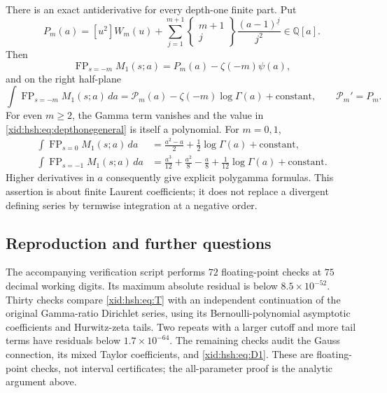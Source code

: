 There is an exact antiderivative for every depth-one finite part. Put
\[
 P_m(a)=[u^2]W_m(u)+
       \sum_{j=1}^{m+1}{\left\{\begin{matrix}m+1\\j\end{matrix}\right\}}
                 \frac{(a-1)^{\underline j}}{j^2}\in\mathbb Q[a].
\]
Then
\begin{equation}\label{xid:hsh:eq:depthonegeneral}
 \operatorname{FP}_{s=-m}M_1(s;a)
       =P_m(a)-\zeta(-m)\psi(a),
\end{equation}
and on the right half-plane
\begin{equation}\label{xid:hsh:eq:primitive}
 \int\operatorname{FP}_{s=-m}M_1(s;a)\,da
       =\mathcal P_m(a)-\zeta(-m)\log\Gamma(a)+\text{constant},
 \qquad \mathcal P_m'=P_m.
\end{equation}
For even $m\ge2$, the Gamma term vanishes and the value in
\eqref{xid:hsh:eq:depthonegeneral} is itself a polynomial. For $m=0,1$,
\begin{align*}
 \int\operatorname{FP}_{s=0}M_1(s;a)\,da
       &=\frac{a^2-a}{2}+\frac12\log\Gamma(a)+\text{constant},\\
 \int\operatorname{FP}_{s=-1}M_1(s;a)\,da
       &=\frac{a^3}{12}+\frac{a^2}{8}-\frac a8
                      +\frac1{12}\log\Gamma(a)+\text{constant}.
\end{align*}
Higher derivatives in $a$ consequently give explicit polygamma formulas.
This assertion is about finite Laurent coefficients; it does not replace
a divergent defining series by termwise integration at a negative order.

\subsection{Reproduction and further questions}

The accompanying verification script performs $72$ floating-point checks
at $75$ decimal working digits. Its maximum absolute residual is below
$8.5\times10^{-52}$. Thirty checks compare \eqref{xid:hsh:eq:T} with an
independent continuation of the original Gamma-ratio Dirichlet series,
using its Bernoulli-polynomial asymptotic coefficients and Hurwitz-zeta
tails. Two repeats with a larger cutoff and more tail terms have residuals
below $1.7\times10^{-64}$. The remaining checks audit the Gauss connection,
its mixed Taylor coefficients, and \eqref{xid:hsh:eq:D1}. These are
floating-point checks, not interval certificates; the all-parameter
proof is the analytic argument above.

